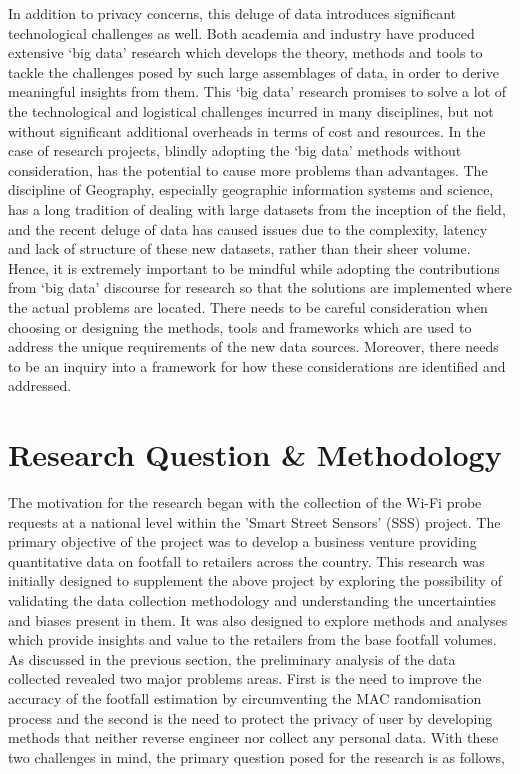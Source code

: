 In addition to privacy concerns, this deluge of data introduces significant technological challenges as well. 
Both academia and industry have produced extensive `big data' research which develops the theory, methods and tools to tackle the challenges posed by such large assemblages of data, in order to derive meaningful insights from them.
This `big data' research promises to solve a lot of the technological and logistical challenges incurred in many disciplines, but not without significant additional overheads in terms of cost and resources.
In the case of research projects, blindly adopting the `big data' methods without consideration, has the potential to cause more problems than advantages.
The discipline of Geography, especially geographic information systems and science, has a long tradition of dealing with large datasets from the inception of the field, and the recent deluge of data has caused issues due to the complexity, latency and lack of structure of these new datasets, rather than their sheer volume.
Hence, it is extremely important to be mindful while adopting the contributions from `big data' discourse for research so that the solutions are implemented where the actual problems are located.
There needs to be careful consideration when choosing or designing the methods, tools and frameworks which are used to address the unique requirements of the new data sources.
Moreover, there needs to be an inquiry into a framework for how these considerations are identified and addressed.

\section{Research Question \& Methodology}

The motivation for the research began with the collection of the Wi-Fi probe requests at a national level within the 'Smart Street Sensors' (SSS) project.
The primary objective of the project was to develop a business venture providing quantitative data on footfall to retailers across the country.
This research was initially designed to supplement the above project by exploring the possibility of validating the data collection methodology and understanding the uncertainties and biases present in them. 
It was also designed to explore methods and analyses which provide insights and value to the retailers from the base footfall volumes. 
As discussed in the previous section, the preliminary analysis of the data collected revealed two major problems areas. 
First is the need to improve the accuracy of the footfall estimation by circumventing the MAC randomisation process and the second is the need to protect the privacy of user by developing methods that neither reverse engineer nor collect any personal data.
With these two challenges in mind, the primary question posed for the research is as follows, 

